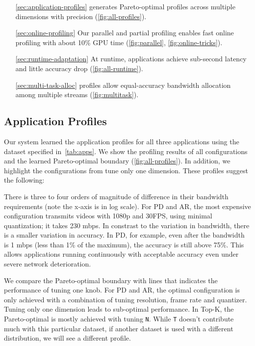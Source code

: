 \begin{itemize}
\item[\autoref{sec:application-profiles}] \sysname{} generates Pareto-optimal
  profiles across multiple dimensions with precision
  (\autoref{fig:all-profiles}).
\item[\autoref{sec:online-profiling}] Our parallel and partial profiling enables
  fast online profiling with about 10\% GPU time (\autoref{fig:parallel},
  \autoref{fig:online-tricks}).
\item[\autoref{sec:runtime-adaptation}] At runtime, \sysname{} applications
  achieve sub-second latency and little accuracy drop
  (\autoref{fig:all-runtime}).
\item[\autoref{sec:multi-task-alloc}] \sysname{} profiles allow equal-accuracy
  bandwidth allocation among multiple streams (\autoref{fig:multitask}).
\end{itemize}

\subsection{Application Profiles}
\label{sec:application-profiles}

Our system learned the application profiles for all three applications using the
dataset specified in~\autoref{tab:apps}. We show the profiling results of all
configurations and the learned Pareto-optimal boundary
(\autoref{fig:all-profiles}). In addition, we highlight the configurations from
tune only one dimension. These profiles suggest the following:

 There is three to four orders of
magnitude of difference in their bandwidth requirements (note the x-axis is in
log scale). For PD and AR, the most expensive configuration transmits videos
with 1080p and 30FPS, using minimal quantization; it takes 230 mbps. In
constrast to the variation in bandwidth, there is a smaller variation in
accuracy. In PD, for example, even after the bandwidth is 1 mbps (less than 1\%
of the maximum), the accuracy is still above 75\%. This allows \sysname{}
applications running continuously with acceptable accuracy even under severe
network deterioration.

 We compare the
Pareto-optimal boundary with lines that indicates the performance of tuning one
knob. For PD and AR, the optimal configuration is only achieved with a
combination of tuning resolution, frame rate and quantizer. Tuning only one
dimension leads to sub-optimal performance. In Top-K, the Pareto-optimal is
mostly achieved with tuning \texttt{N}. While \texttt{T} doesn't contribute much
with this particular dataset, if another dataset is used with a different
distribution, we will see a different profile.


